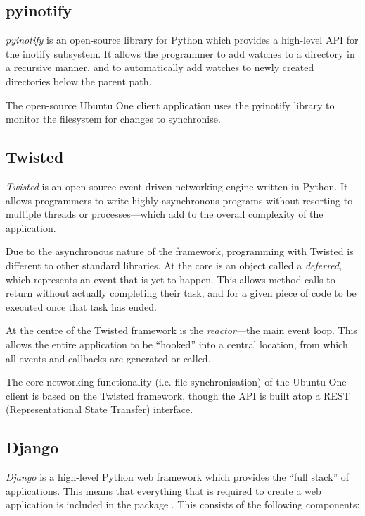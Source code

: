 \subsection{pyinotify}

\emph{pyinotify} is an open-source library for Python which provides
a high-level API for the inotify subsystem. It allows the programmer to add
watches to a directory in a recursive manner, and to automatically add watches
to newly created directories below the parent path.

The open-source Ubuntu One client application uses the pyinotify library to
monitor the filesystem for changes to synchronise\cite{UbuntuOne-servers}.

\subsection{Twisted}

\emph{Twisted} is an open-source event-driven networking engine written in
Python. It allows programmers to write highly asynchronous programs without
resorting to multiple threads or processes---which add to the overall
complexity of the application\cite{kinder2005}.

Due to the asynchronous nature of the framework, programming with Twisted is
different to other standard libraries. At the core is an object called
a \emph{deferred}, which represents an event that is yet to happen. This allows
method calls to return without actually completing their task, and for a given
piece of code to be executed once that task has ended.

At the centre of the Twisted framework is the \emph{reactor}---the main event
loop. This allows the entire application to be ``hooked'' into a central
location, from which all events and callbacks are generated or called.

The core networking functionality (i.e. file synchronisation) of the Ubuntu One
client is based on the Twisted framework\cite{UbuntuOne-servers}, though the
API is built atop a REST (Representational State Transfer) interface.

\subsection{Django}

\emph{Django} is a high-level Python web framework which provides the ``full
stack'' of applications. This means that everything that is required to create
a web application is included in the package \cite{plekhanova2009}. This
consists of the following components:

